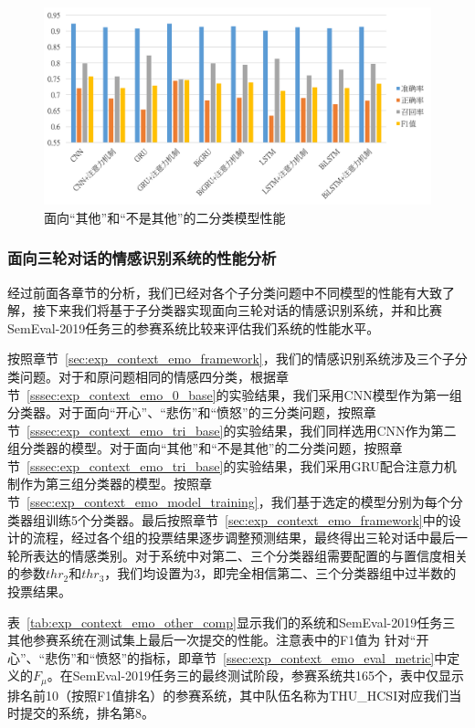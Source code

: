 \begin{figure}[H]
  \centering
  \includegraphics[width=\textwidth]{img/exp_context_emo_b_result_bar.png}
  \caption{面向“其他”和“不是其他”的二分类模型性能}
  \label{fig:exp_context_emo_b_result_bar}
\end{figure}

\subsubsection{面向三轮对话的情感识别系统的性能分析}

经过前面各章节的分析，我们已经对各个子分类问题中不同模型的性能有大致了解，接下来我们将基于子分类器实现面向三轮对话的情感识别系统，并和比赛SemEval-2019任务三的参赛系统比较来评估我们系统的性能水平。

按照章节~\ref{sec:exp_context_emo_framework}，我们的情感识别系统涉及三个子分类问题。对于和原问题相同的情感四分类，根据章节~\ref{sssec:exp_context_emo_0_base}的实验结果，我们采用CNN模型作为第一组分类器。对于面向“开心”、“悲伤”和“愤怒”的三分类问题，按照章节~\ref{sssec:exp_context_emo_tri_base}的实验结果，我们同样选用CNN作为第二组分类器的模型。对于面向“其他”和“不是其他”的二分类问题，按照章节~\ref{sssec:exp_context_emo_tri_base}的实验结果，我们采用GRU配合注意力机制作为第三组分类器的模型。按照章节~\ref{ssec:exp_context_emo_model_training}，我们基于选定的模型分别为每个分类器组训练5个分类器。最后按照章节~\ref{sec:exp_context_emo_framework}中的设计的流程，经过各个组的投票结果逐步调整预测结果，最终得出三轮对话中最后一轮所表达的情感类别。对于系统中对第二、三个分类器组需要配置的与置信度相关的参数$thr_2$和$thr_3$，我们均设置为3，即完全相信第二、三个分类器组中过半数的投票结果。

表~\ref{tab:exp_context_emo_other_comp}显示我们的系统和SemEval-2019任务三其他参赛系统在测试集上最后一次提交的性能。注意表中的F1值为
针对“开心”、“悲伤”和“愤怒”的指标，即章节~\ref{ssec:exp_context_emo_eval_metric}中定义的$F_\mu$。在SemEval-2019任务三的最终测试阶段，参赛系统共165个，表中仅显示排名前10（按照F1值排名）的参赛系统，其中队伍名称为THU\_HCSI对应我们当时提交的系统，排名第8。

